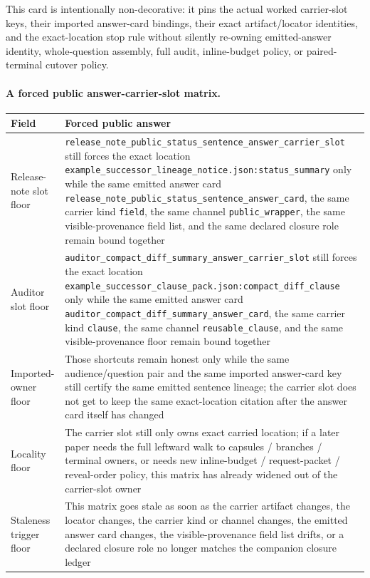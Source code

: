 \documentclass[11pt]{article}
\begin{document}
This card is intentionally non-decorative: it pins the actual worked carrier-slot keys, their imported answer-card bindings, their exact artifact/locator identities, and the exact-location stop rule without silently re-owning emitted-answer identity, whole-question assembly, full audit, inline-budget policy, or paired-terminal cutover policy.\cite{series:workedexample}

\paragraph{A forced public answer-carrier-slot matrix.}
\begin{table}[t]
\centering
\small
\begin{tabularx}{\linewidth}{@{}lX@{}}
\toprule
Field & Forced public answer \\
\midrule
Release-note slot floor & \nolinkurl{release_note_public_status_sentence_answer_carrier_slot} still forces the exact location \nolinkurl{example_successor_lineage_notice.json:status_summary} only while the same emitted answer card \nolinkurl{release_note_public_status_sentence_answer_card}, the same carrier kind \texttt{field}, the same channel \nolinkurl{public_wrapper}, the same visible-provenance field list, and the same declared closure role remain bound together \\
Auditor slot floor & \nolinkurl{auditor_compact_diff_summary_answer_carrier_slot} still forces the exact location \nolinkurl{example_successor_clause_pack.json:compact_diff_clause} only while the same emitted answer card \nolinkurl{auditor_compact_diff_summary_answer_card}, the same carrier kind \texttt{clause}, the same channel \nolinkurl{reusable_clause}, and the same visible-provenance floor remain bound together \\
Imported-owner floor & Those shortcuts remain honest only while the same audience/question pair and the same imported answer-card key still certify the same emitted sentence lineage; the carrier slot does not get to keep the same exact-location citation after the answer card itself has changed \\
Locality floor & The carrier slot still only owns exact carried location; if a later paper needs the full leftward walk to capsules / branches / terminal owners, or needs new inline-budget / request-packet / reveal-order policy, this matrix has already widened out of the carrier-slot owner \\
Staleness trigger floor & This matrix goes stale as soon as the carrier artifact changes, the locator changes, the carrier kind or channel changes, the emitted answer card changes, the visible-provenance field list drifts, or a declared closure role no longer matches the companion closure ledger \\

\end{tabularx}
\end{table}
\end{document}
